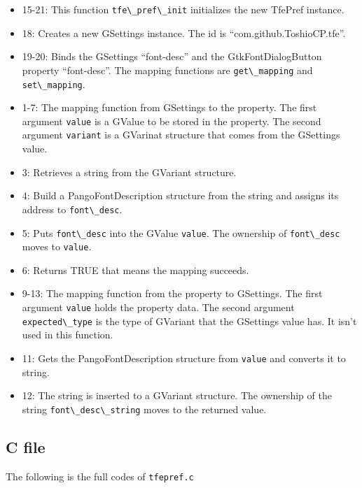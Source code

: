 \begin{itemize}
\tightlist
\item
  15-21: This function \passthrough{\lstinline!tfe\_pref\_init!}
  initializes the new TfePref instance.
\item
  18: Creates a new GSettings instance. The id is
  ``com.github.ToshioCP.tfe''.
\item
  19-20: Binds the GSettings ``font-desc'' and the GtkFontDialogButton
  property ``font-desc''. The mapping functions are
  \passthrough{\lstinline!get\_mapping!} and
  \passthrough{\lstinline!set\_mapping!}.
\item
  1-7: The mapping function from GSettings to the property. The first
  argument \passthrough{\lstinline!value!} is a GValue to be stored in
  the property. The second argument \passthrough{\lstinline!variant!} is
  a GVarinat structure that comes from the GSettings value.
\item
  3: Retrieves a string from the GVariant structure.
\item
  4: Build a PangoFontDescription structure from the string and assigns
  its address to \passthrough{\lstinline!font\_desc!}.
\item
  5: Puts \passthrough{\lstinline!font\_desc!} into the GValue
  \passthrough{\lstinline!value!}. The ownership of
  \passthrough{\lstinline!font\_desc!} moves to
  \passthrough{\lstinline!value!}.
\item
  6: Returns TRUE that means the mapping succeeds.
\item
  9-13: The mapping function from the property to GSettings. The first
  argument \passthrough{\lstinline!value!} holds the property data. The
  second argument \passthrough{\lstinline!expected\_type!} is the type
  of GVariant that the GSettings value has. It isn't used in this
  function.
\item
  11: Gets the PangoFontDescription structure from
  \passthrough{\lstinline!value!} and converts it to string.
\item
  12: The string is inserted to a GVariant structure. The ownership of
  the string \passthrough{\lstinline!font\_desc\_string!} moves to the
  returned value.
\end{itemize}

\subsection{C file}\label{c-file}

The following is the full codes of \passthrough{\lstinline!tfepref.c!}

